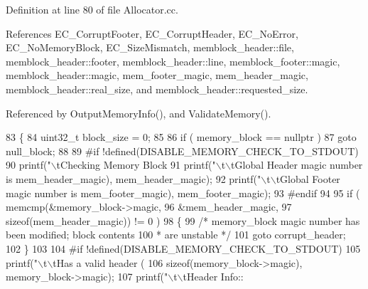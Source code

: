 Definition at line 80 of file Allocator.\-cc.



References E\-C\-\_\-\-Corrupt\-Footer, E\-C\-\_\-\-Corrupt\-Header, E\-C\-\_\-\-No\-Error, E\-C\-\_\-\-No\-Memory\-Block, E\-C\-\_\-\-Size\-Mismatch, memblock\-\_\-header\-::file, memblock\-\_\-header\-::footer, memblock\-\_\-header\-::line, memblock\-\_\-footer\-::magic, memblock\-\_\-header\-::magic, mem\-\_\-footer\-\_\-magic, mem\-\_\-header\-\_\-magic, memblock\-\_\-header\-::real\-\_\-size, and memblock\-\_\-header\-::requested\-\_\-size.



Referenced by Output\-Memory\-Info(), and Validate\-Memory().


\begin{DoxyCode}
83 \{
84         uint32\_t        block\_size = 0;
85 
86         \textcolor{keywordflow}{if} ( memory\_block == \textcolor{keyword}{nullptr} )
87                 \textcolor{keywordflow}{goto} null\_block;
88 
89 \textcolor{preprocessor}{#if !defined(DISABLE\_MEMORY\_CHECK\_TO\_STDOUT)
}
90 \textcolor{preprocessor}{}        printf(\textcolor{stringliteral}{"\(\backslash\)tChecking Memory Block %
91         printf(\textcolor{stringliteral}{"\(\backslash\)t\(\backslash\)tGlobal Header magic number is %
      mem_header_magic), mem_header_magic);
92         printf(\textcolor{stringliteral}{"\(\backslash\)t\(\backslash\)tGlobal Footer magic number is %
      mem_footer_magic), mem_footer_magic);
93 \textcolor{preprocessor}{#endif
}
94 \textcolor{preprocessor}{}
95         \textcolor{keywordflow}{if} ( memcmp(&memory\_block->magic,
96                 &mem_header_magic,
97                 \textcolor{keyword}{sizeof}(mem_header_magic)) != 0 )
98         \{
99                 \textcolor{comment}{/* memory\_block magic number has been modified; block contents
}
100 \textcolor{comment}{                 * are unstable */}
101                 \textcolor{keywordflow}{goto} corrupt\_header;
102         \}
103 
104 \textcolor{preprocessor}{#if !defined(DISABLE\_MEMORY\_CHECK\_TO\_STDOUT)
}
105 \textcolor{preprocessor}{}        printf(\textcolor{stringliteral}{"\(\backslash\)t\(\backslash\)tHas a valid header (%
106                 \textcolor{keyword}{sizeof}(memory\_block->magic), memory\_block->magic);
107         printf(\textcolor{stringliteral}{"\(\backslash\)t\(\backslash\)tHeader Info:: %
}}}}}
\end{DoxyCode}
